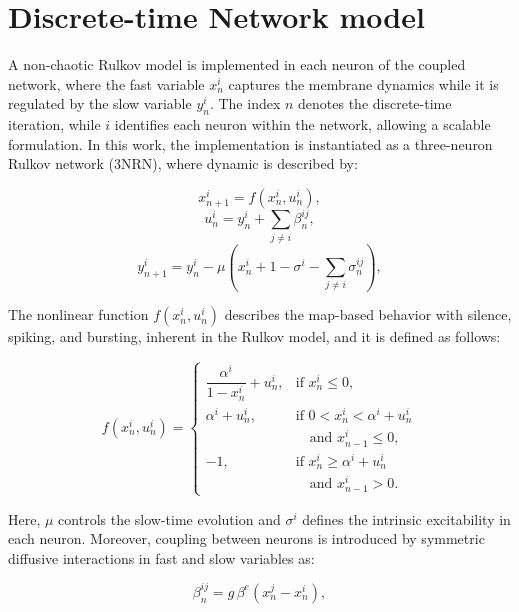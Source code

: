 \documentclass[lettersize,journal]{IEEEtran}
\begin{document}
\section{Discrete-time Network model}\label{Model}

A non-chaotic Rulkov model is implemented in each neuron of the coupled network, where the fast variable $x^i_n$ captures the membrane dynamics while it is regulated by the slow variable $y^i_n$. The index $n$ denotes the discrete-time iteration, while $i$ identifies each neuron within the network, allowing a scalable formulation. In this work, the implementation is instantiated as a three-neuron Rulkov network (3NRN), where dynamic is described by:

\begin{equation}
    x^i_{n+1}=f(x^i_{n},u^i_n), \label{eq1}
\end{equation}
\begin{equation}
    u^i_n= y^i_n + \sum_{j \neq i} \beta^{ij}_n ,\label{eq2}
\end{equation}
\begin{equation}
    y^i_{n+1}=y^i_{n}-\mu\left( x_n^i + 1 - \sigma^i - \sum_{j \neq i} \sigma_n^{ij} \right),\label{eq3}
\end{equation}

\noindent The nonlinear function $f(x^i_n,u^i_n)$ describes the map-based behavior with silence, spiking, and bursting, inherent in the Rulkov model, and it is defined as follows:

\begin{equation}
f(x^i_n,u^i_n) =
\begin{cases}
    \dfrac{\alpha^i}{1 - x_n^i} + u^i_n,
    & \text{if } x_n^i \le 0, \\[4pt]
    \alpha^i +  u^i_n,
    & \text{if } 0 < x_n^i < \alpha^i + u^i_n \\
     & \quad \text{and } x_{n-1}^i \le 0, \\[4pt]
    -1,
    & \text{if } x_n^i \ge \alpha^i +u^i_n \\
    & \quad \text{and } x_{n-1}^i > 0.
\end{cases}
\label{eq:rulkov_map}
\end{equation}

Here, $\mu$ controls the slow-time evolution and $\sigma^i$ defines the intrinsic excitability in each neuron. Moreover, coupling between neurons is introduced by symmetric diffusive interactions in fast and slow variables as:

\begin{equation}
\label{Eq5}
    \beta_n^{ij} = g \, \beta^e \left( x_n^j - x_n^i \right),
\end{equation}
\end{document}
